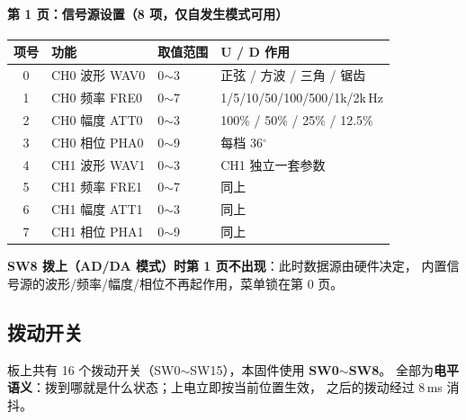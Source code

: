 \documentclass[UTF8,a4paper,11pt]{ctexart}
\begin{document}
\paragraph{第 1 页：信号源设置（8 项，仅自发生模式可用）}
\begin{center}
\small
\begin{tabular}{clll}
\toprule
项号 & 功能 & 取值范围 & U / D 作用\\
\midrule
0 & CH0 波形 WAV0 & 0$\sim$3 & 正弦 / 方波 / 三角 / 锯齿\\
1 & CH0 频率 FRE0 & 0$\sim$7 & 1/5/10/50/100/500/1k/2k\,Hz\\
2 & CH0 幅度 ATT0 & 0$\sim$3 & 100\% / 50\% / 25\% / 12.5\%\\
3 & CH0 相位 PHA0 & 0$\sim$9 & 每档 36$^\circ$\\
4 & CH1 波形 WAV1 & 0$\sim$3 & CH1 独立一套参数\\
5 & CH1 频率 FRE1 & 0$\sim$7 & 同上\\
6 & CH1 幅度 ATT1 & 0$\sim$3 & 同上\\
7 & CH1 相位 PHA1 & 0$\sim$9 & 同上\\
\bottomrule
\end{tabular}
\end{center}

\begin{tipbox}
\textbf{SW8 拨上（AD/DA 模式）时第 1 页不出现}：此时数据源由硬件决定，
内置信号源的波形/频率/幅度/相位不再起作用，菜单锁在第 0 页。
\end{tipbox}

\subsection{拨动开关}
\label{sec:sw}

板上共有 16 个拨动开关（SW0$\sim$SW15），本固件使用 \textbf{SW0$\sim$SW8}。
全部为\textbf{电平语义}：拨到哪就是什么状态；上电立即按当前位置生效，
之后的拨动经过 8\,ms 消抖。
\end{document}
